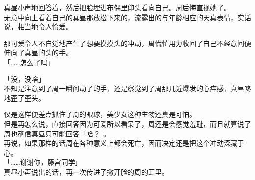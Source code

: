 真昼小声地回答着，然后把脸埋进布偶里仰头看向自己。周后悔直视她了。\\

无意中向上看着自己的真昼那放松下来的，流露出的与年龄相应的天真表情，实话说，相当地令人怜爱。

那可爱令人不自觉地产生了想要摸摸头的冲动，周慌忙用力收回了自己不经意间便伸向了真昼的头的手。\\

「……怎么了吗」

「没，没啥」\\

不知是注意到了周一瞬间动了的手，还是察觉到了周那几近爆发的心痒感，真昼咚地歪了歪头。

仅是这样便差点抓住了周的眼球，美少女这种生物还真是可怕。\\

但是再怎么说，直接回答因为可爱所以看呆了，周还是会感觉羞耻，而且就算说了周也确信真昼只可能回答「哈？」。\\

再说，如果那样的话周在各种意义上都会死亡，因而决定还是把这个冲动深藏于心。\\

「……谢谢你，藤宫同学」\\

真昼小声说出的话，再一次传进了撇开脸的周的耳里。

